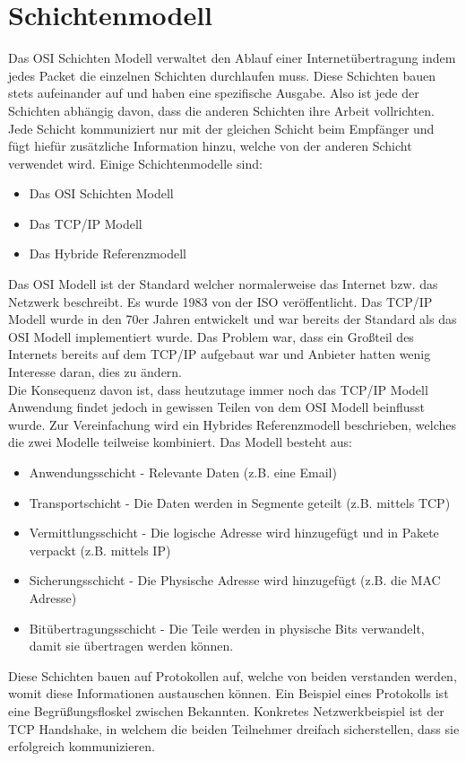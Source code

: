 \documentclass{article}
\begin{document}
	 \section{Schichtenmodell}
	 Das OSI Schichten Modell verwaltet den Ablauf einer Internetübertragung indem jedes Packet die einzelnen Schichten durchlaufen muss. Diese Schichten bauen stets aufeinander auf und haben eine spezifische Ausgabe. Also ist jede der Schichten abhängig davon, dass die anderen Schichten ihre Arbeit vollrichten. Jede Schicht kommuniziert nur mit der gleichen Schicht beim Empfänger und fügt hiefür zusätzliche Information hinzu, welche von der anderen Schicht verwendet wird. Einige Schichtenmodelle sind:
	 \begin{itemize}
	 	\item{Das OSI Schichten Modell}
	 	\item{Das TCP/IP Modell}
	 	\item{Das Hybride Referenzmodell}
	 \end{itemize}
	 Das OSI Modell ist der Standard welcher normalerweise das Internet bzw. das Netzwerk beschreibt. Es wurde 1983 von der ISO veröffentlicht. Das TCP/IP Modell wurde in den 70er Jahren entwickelt und war bereits der Standard als das OSI Modell implementiert wurde. Das Problem war, dass ein Großteil des Internets bereits auf dem TCP/IP aufgebaut war und Anbieter hatten wenig Interesse daran, dies zu ändern. \\
	 Die Konsequenz davon ist, dass heutzutage immer noch das TCP/IP Modell Anwendung findet jedoch in gewissen Teilen von dem OSI Modell beinflusst wurde. Zur Vereinfachung wird ein Hybrides Referenzmodell beschrieben, welches die zwei Modelle teilweise kombiniert. Das Modell besteht aus:
	 \begin{itemize}
	 	\item{Anwendungsschicht - Relevante Daten (z.B. eine Email)}
	 	\item{Transportschicht - Die Daten werden in Segmente geteilt (z.B. mittels TCP)}
	 	\item{Vermittlungsschicht - Die logische Adresse wird hinzugefügt und in Pakete verpackt (z.B. mittels IP)}
	 	\item{Sicherungsschicht - Die Physische Adresse wird hinzugefügt (z.B. die MAC Adresse)}
	 	\item{Bitübertragungsschicht - Die Teile werden in physische Bits verwandelt, damit sie übertragen werden können.}
	 \end{itemize}
	 Diese Schichten bauen auf Protokollen auf, welche von beiden verstanden werden, womit diese Informationen austauschen können. Ein Beispiel eines Protokolls ist eine Begrüßungsfloskel zwischen Bekannten. Konkretes Netzwerkbeispiel ist der TCP Handshake, in welchem die beiden Teilnehmer dreifach sicherstellen, dass sie erfolgreich kommunizieren. \\
\end{document}
